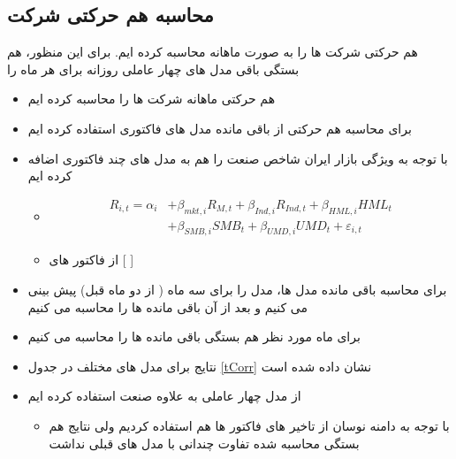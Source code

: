 \subsection{محاسبه هم حرکتی شرکت }
\label{comovement}
هم حرکتی شرکت ها را به صورت ماهانه محاسبه کرده ایم. برای این منظور، هم بستگی باقی مدل های چهار عاملی روزانه برای هر ماه را 
\begin{itemize}
	\item
	هم حرکتی ماهانه شرکت ها را محاسبه کرده ایم
	\item
	برای محاسبه هم حرکتی از باقی مانده مدل های فاکتوری استفاده کرده ایم
	\item
	با توجه به ویژگی بازار ایران شاخص صنعت را هم به مدل های چند فاکتوری اضافه کرده ایم

\begin{itemize}
	\item 
		\begin{equation}
		\begin{split}
			R_{i,t} =\alpha _{i}&+\beta _{mkt,i}{\mathit {R}}_{M,t} + \beta_{Ind,i}{\mathit {R}}_{Ind,t}+\beta _{HML,i}{\mathit {HML}}_{t} \\
			&+\beta _{SMB,i}{\mathit {SMB}}_{t}+\beta _{UMD,i}{\mathit {UMD}}_{t}+ \varepsilon_{i,t}
		\end{split}
		\label{e5Factor}
	\end{equation}
	\item
	از فاکتور های  [
	]
\end{itemize}
	
	\item
	برای محاسبه باقی مانده مدل ها، مدل را برای سه ماه ( از دو ماه قبل) پیش بینی می کنیم و بعد از آن باقی مانده ها را محاسبه می کنیم
	\item
	برای ماه مورد نظر هم بستگی باقی مانده ها را محاسبه می کنیم
	\item
	نتایج برای مدل های مختلف  در جدول
	\ref{tCorr}
	نشان داده شده است
	\item
	از مدل چهار عاملی به علاوه صنعت استفاده کرده ایم
	\begin{itemize}
		\item 
		با توجه به دامنه نوسان از تاخیر های فاکتور ها هم استفاده کردیم ولی نتایج  هم بستگی محاسبه شده تفاوت چندانی با مدل های قبلی نداشت
	\end{itemize}
	
\end{itemize}

     
\begin{LTR}
\end{LTR}
      

